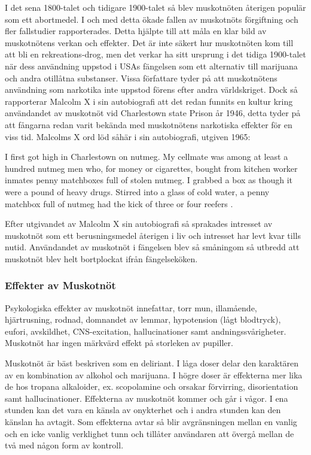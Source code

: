 I det sena 1800-talet och tidigare 1900-talet så blev muskotnöten återigen populär som ett
abortmedel. I och med detta ökade fallen av muskotnöts förgiftning och fler fallstudier rapporterades.
Detta hjälpte till att måla en klar bild av muskotnötens verkan och effekter.
Det är inte säkert hur muskotnöten kom till att bli en rekreations-drog, men det verkar ha sitt
ursprung i det tidiga 1900-talet när dess användning uppstod i USAs fängelsen som ett alternativ
till marijuana och andra otillåtna substanser.
Vissa författare tyder på att muskotnötens användning som narkotika inte uppstod förens efter
andra världskriget. Dock så rapporterar Malcolm X i sin autobiografi att det redan funnits en kultur kring
användandet av muskotnöt vid Charlestown state Prison år 1946, detta tyder på att fångarna redan
varit bekända med muskotnötens narkotiska effekter för en viss tid.
Malcolms X ord löd såhär i sin autobiografi, utgiven 1965:
\begin{displayquote}

I first got high in Charlestown on nutmeg. My cellmate was among at least a
hundred nutmeg men who, for money or cigarettes, bought from kitchen worker
inmates penny matchboxes full of stolen nutmeg. I grabbed a box as though it
were a pound of heavy drugs. Stirred into a glass of cold water, a penny
matchbox full of nutmeg had the kick of three or four reefers \cite{malcolmx}.

\end{displayquote}

Efter utgivandet av Malcolm X sin autobiografi så sprakades intresset av muskotnöt som ett
berusningsmedel återigen i liv och intresset har levt kvar tills nutid.
Användandet av muskotnöt i fängelsen blev så småningom så utbredd att muskotnöt blev
helt bortplockat ifrån fängelseköken.




\subsubsection{Effekter av Muskotnöt}

Psykologiska effekter av muskotnöt innefattar, torr mun, illamående, hjärtrusning, rodnad,
domnandet av lemmar, hypotension (lågt blodtryck), eufori, avskildhet, CNS-excitation,
hallucinationer samt andningssvårigheter.
Muskotnöt har ingen märkvärd effekt på storleken av pupiller. \cite{entheogenreview}

Muskotnöt är bäst beskriven som en deliriant. I låga doser delar den karaktären av en kombination av alkohol och marijuana. I högre doser är effekterna mer lika de hos tropana alkaloider, ex. scopolamine och orsakar förvirring, disorientation samt hallucinationer.
Effekterna av muskotnöt kommer och går i vågor. I ena stunden kan det vara en känsla av onykterhet och i andra stunden kan den känslan ha avtagit.
Som effekterna avtar så blir avgränsningen mellan en vanlig och en icke vanlig verklighet tunn och tillåter användaren att övergå mellan de två med någon form av kontroll.

